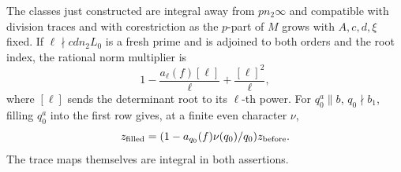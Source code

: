 \begin{proposition}\label{single:siegel-traces}
The classes just constructed are integral away from \(pn_2\infty\)
and compatible with division traces and with corestriction as the
\(p\)-part of \(M\) grows with \(A,c,d,\xi\) fixed.
If \(\ell\nmid cdn_2L_0\) is a fresh prime and is adjoined to both
orders and the root index, the rational norm multiplier is
\begin{equation}\label{single:good-norm}
 1-\frac{a_\ell(f)[\ell]}{\ell}+\frac{[\ell]^2}{\ell},
\end{equation}
where \([\ell]\) sends the determinant root to its \(\ell\)-th power.
For \(q_0^a\parallel b\), \(q_0\nmid b_1\), filling \(q_0^a\)
into the first row gives, at a finite even character \(\nu\),
\begin{equation}\label{single:bad-row}
 z_{\rm filled}=(1-a_{q_0}(f)\nu(q_0)/q_0)z_{\rm before}.
\end{equation}
The trace maps themselves are integral in both assertions.
\end{proposition}
